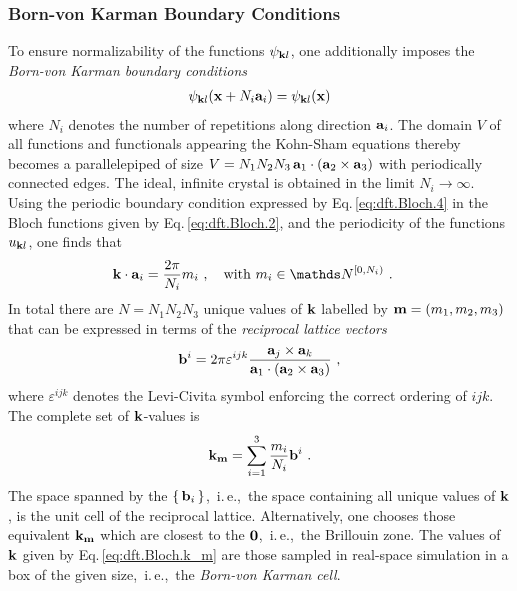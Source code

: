 \subsubsection{Born-von Karman Boundary Conditions}
To ensure normalizability of the functions $\psi_{{\bf k}l}$, one additionally imposes the \emph{Born-von Karman boundary conditions}
\begin{align}
	\psi_{{\bf k}l} ({\bf x} + N_i {\bf a}_i) 
		= \psi_{{\bf k}l} ({\bf x})
	\label{eq:dft.Bloch.4}
\end{align}
where $N_i$ denotes the number of repetitions along direction ${\bf a}_i$. The domain $V$ of all functions and functionals appearing the Kohn-Sham equations thereby becomes a parallelepiped of size 
$V = N_1 N_2 N_3 \, {\bf a}_1 \cdot ({\bf a}_2 \times {\bf a}_3)$ with periodically connected edges. The ideal, infinite crystal is obtained in the limit $N_i \rightarrow \infty$.
Using the periodic boundary condition expressed by Eq.\,\eqref{eq:dft.Bloch.4} in the Bloch functions given by Eq.\,\eqref{eq:dft.Bloch.2}, and the periodicity of the functions $u_{{\bf k} l}$, one finds that
\begin{align}
		{\bf k} \cdot {\bf a}_i
			&= \frac{2 \pi}{N_i} m_i~,\quad\text{with } m_i \in \mathds N^{[0, N_i)}~.
	\label{eq:dft.Bloch.5}
\end{align}
In total there are $N = N_1 N_2 N_3$ unique values of $\bf k$ labelled by ${\bf m} = (m_1, m_2, m_3)$ that can be expressed in terms of the \emph{reciprocal lattice vectors}~\cite{Sands2002}
\begin{align}
	{\bf b}^i 
		= 2 \pi \varepsilon^{ijk} \frac{{\bf a}_j \times {\bf a}_k}{{\bf a}_1 \cdot ({\bf a}_2 \times {\bf a}_3)} ~,
	\label{eq:dft.Bloch.bi}
\end{align}
where $\varepsilon^{ijk}$ denotes the Levi-Civita symbol enforcing the correct ordering of $ijk$. The complete set of $\bf k$-values is
\begin{align}
	{\bf k}_{\bf m} 
		= \sum_{i=1}^3 \frac{m_i}{N_i} {\bf b}^i~.
	\label{eq:dft.Bloch.k_m}
\end{align}
The space spanned by the $\set{{\bf b}_i}$,~i.\,e.,~the space containing all unique values of ${\bf k}$, is the unit cell of the reciprocal lattice. Alternatively, one chooses those equivalent $\bf k_m$ which are closest to the $\bf 0$,~i.\,e.,~the Brillouin zone. The values of $\bf k$ given by Eq.\,\eqref{eq:dft.Bloch.k_m} are those sampled in real-space simulation in a box of the given size,~i.\,e.,~the \emph{Born-von Karman cell}.

